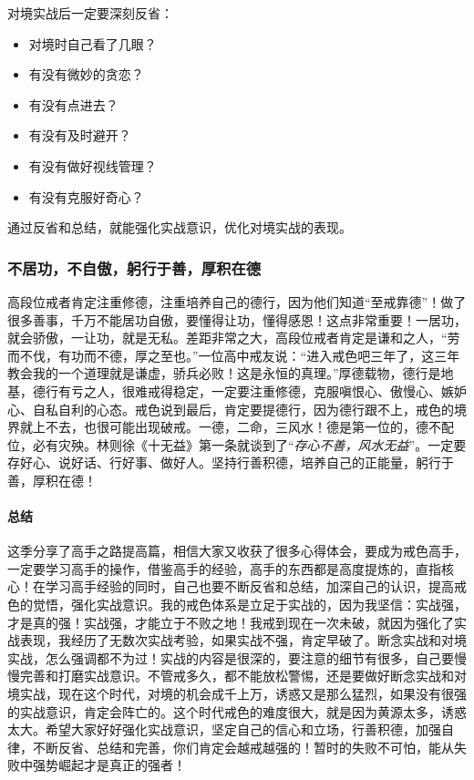 对境实战后一定要深刻反省：

\begin{multicols}{2}
    \begin{itemize}
        \item 对境时自己看了几眼？
        \item 有没有微妙的贪恋？
        \item 有没有点进去？
        \item 有没有及时避开？
        \item 有没有做好视线管理？
        \item 有没有克服好奇心？
    \end{itemize}
\end{multicols}

通过反省和总结，就能强化实战意识，优化对境实战的表现。

\subsubsection{不居功，不自傲，躬行于善，厚积在德}

高段位戒者肯定注重修德，注重培养自己的德行，因为他们知道“至戒靠德”！做了很多善事，千万不能居功自傲，要懂得让功，懂得感恩！这点非常重要！一居功，就会骄傲，一让功，就是无私。差距非常之大，高段位戒者肯定是谦和之人，“劳而不伐，有功而不德，厚之至也。”一位高中戒友说：“进入戒色吧三年了，这三年教会我的一个道理就是谦虚，骄兵必败！这是永恒的真理。”厚德载物，德行是地基，德行有亏之人，很难戒得稳定，一定要注重修德，克服嗔恨心、傲慢心、嫉妒心、自私自利的心态。戒色说到最后，肯定要提德行，因为德行跟不上，戒色的境界就上不去，也很可能出现破戒。一德，二命，三风水！德是第一位的，德不配位，必有灾殃。林则徐《十无益》第一条就谈到了“\textit{存心不善，风水无益}”。一定要存好心、说好话、行好事、做好人。坚持行善积德，培养自己的正能量，躬行于善，厚积在德！

\paragraph*{总结}

这季分享了高手之路提高篇，相信大家又收获了很多心得体会，要成为戒色高手，一定要学习高手的操作，借鉴高手的经验，高手的东西都是高度提炼的，直指核心！在学习高手经验的同时，自己也要不断反省和总结，加深自己的认识，提高戒色的觉悟，强化实战意识。我的戒色体系是立足于实战的，因为我坚信：实战强，才是真的强！实战强，才能立于不败之地！我戒到现在一次未破，就因为强化了实战表现，我经历了无数次实战考验，如果实战不强，肯定早破了。断念实战和对境实战，怎么强调都不为过！实战的内容是很深的，要注意的细节有很多，自己要慢慢完善和打磨实战意识。不管戒多久，都不能放松警惕，还是要做好断念实战和对境实战，现在这个时代，对境的机会成千上万，诱惑又是那么猛烈，如果没有很强的实战意识，肯定会阵亡的。这个时代戒色的难度很大，就是因为黄源太多，诱惑太大。希望大家好好强化实战意识，坚定自己的信心和立场，行善积德，加强自律，不断反省、总结和完善，你们肯定会越戒越强的！暂时的失败不可怕，能从失败中强势崛起才是真正的强者！


